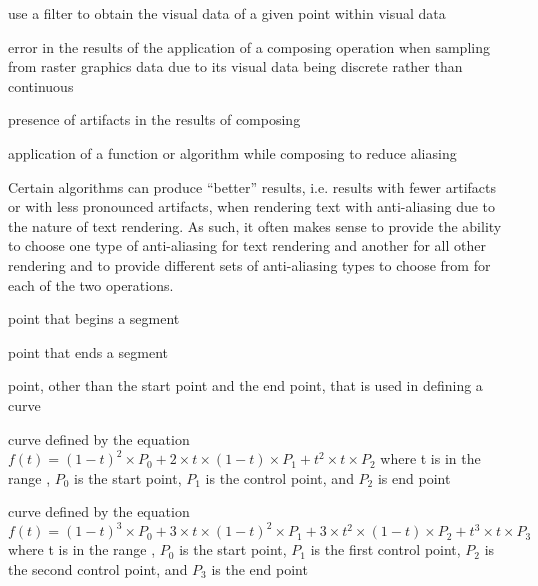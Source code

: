 %
use a filter to obtain the visual data of a given point within visual data

%
error in the results of the application of a composing operation when sampling from raster graphics data due to its visual data being discrete rather than continuous

%
presence of artifacts in the results of composing

%
application of a function or algorithm while composing to reduce aliasing
\begin{note}
Certain algorithms can produce ``better'' results, i.e. results with fewer artifacts or with less pronounced artifacts, when rendering text with anti-aliasing due to the nature of text rendering. As such, it often makes sense to provide the ability to choose one type of anti-aliasing for text rendering and another for all other rendering and to provide different sets of anti-aliasing types to choose from for each of the two operations.
\end{note}

%
%

%
point that begins a segment

%
point that ends a segment

%
point, other than the start point and the end point, that is used in defining a curve

%
%
 curve defined by the 
equation $f(t) = (1 - t)^{2} \times P_{0} + 2 \times t \times (1 - t) 
\times P_{1} + t^{2} \times t \times P_{2}$ where t is in the range , $P_{0}$ is the start point, $P_{1}$ is the control point, and $P_{2}$ is end point

 curve defined by the 
equation $f(t) = (1 - t)^{3} \times P_{0} + 3 \times t \times (1 - t)^{2} 
\times P_{1} + 3 \times t^{2} \times (1 - t) \times P_{2} + t^{3} \times t 
\times P_{3}$ where t is in the range , $P_{0}$ is the start point, $P_{1}$ is the first control point, $P_{2}$ is the second control point, and $P_{3}$ is the end point

